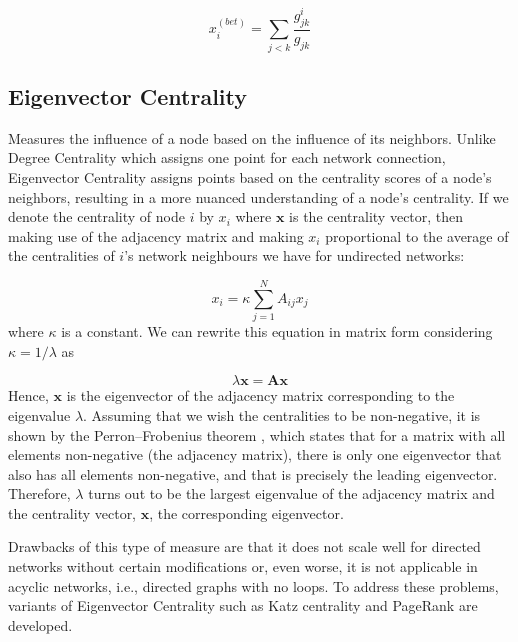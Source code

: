 \begin{equation}
    x_i^{(bet)}= \sum_{j<k}^{}\frac{g_{jk}^i}{g_{jk}}
\end{equation}


\subsection*{Eigenvector Centrality}  Measures the influence of a node based on the influence of its neighbors. Unlike Degree Centrality which assigns one point for each network connection, Eigenvector Centrality assigns points based on the centrality scores of a node's neighbors, resulting in a more nuanced understanding of a node's centrality. If we denote the centrality of node $i$ by $x_i$ where $\mathbf{x}$ is the centrality vector, then making use of the adjacency matrix and making $x_i$ proportional to the average of the centralities of $i$’s network neighbours we have for undirected networks:

\begin{equation}
\label{eqn:eigc}
    x_i= \kappa\sum_{j=1}^{N}A_{ij}x_j
\end{equation}
where $\kappa$ is a constant. We can rewrite this equation in matrix form considering $\kappa=1/\lambda$ as

\begin{equation}
    \lambda \mathbf{x} = \mathbf{A}\mathbf{x}
\end{equation}
Hence, $\mathbf{x}$ is the eigenvector of the adjacency matrix corresponding to the eigenvalue $\lambda$. Assuming that we wish the centralities to be non-negative, it is shown by the Perron–Frobenius theorem \cite{meyer2000matrix}, which states that for a matrix with all elements non-negative (the adjacency matrix), there is only one eigenvector that also has all elements non-negative, and that is precisely the leading eigenvector.  Therefore, $\lambda$ turns out to be the largest eigenvalue of the adjacency matrix and the centrality vector, $\mathbf{x}$, the corresponding eigenvector. 


Drawbacks of this type of measure are that it does not scale well for directed networks without certain modifications or, even worse, it is not applicable in acyclic networks, i.e., directed graphs with no loops. To address these problems, variants of Eigenvector Centrality such as Katz centrality and PageRank are developed.

